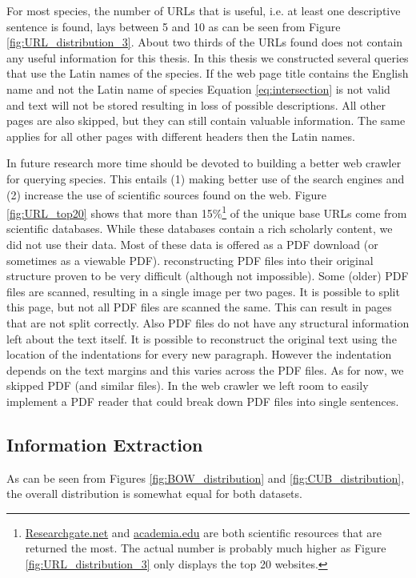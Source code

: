 \documentclass[a4paper, 12pt, oneside]{book} %
\begin{document}
For most species, the number of URLs that is useful, i.e. at least one descriptive sentence is found, lays between 5 and 10 as can be seen from Figure \ref{fig:URL_distribution_3}.
About two thirds of the URLs found does not contain any useful information for this thesis.
In this thesis we constructed several queries that use the Latin names of the species.
If the web page title contains the English name and not the Latin name of species Equation \ref{eq:intersection} is not valid and text will not be stored resulting in loss of possible descriptions.
All other pages are also skipped, but they can still contain valuable information.
The same applies for all other pages with different headers then the Latin names.

In future research more time should be devoted to building a better web crawler for querying species.
This entails (1) making better use of the search engines and (2) increase the use of scientific sources found on the web.
Figure \ref{fig:URL_top20} shows that more than 15\%\footnote{\href{https://www.researchgate.net/}{Researchgate.net} and \href{https://www.academia.edu/}{academia.edu} are both scientific resources that are returned the most. The actual number is probably much higher as Figure \ref{fig:URL_distribution_3} only displays the top 20 websites.} of the unique base URLs come from scientific databases.
While these databases contain a rich scholarly content, we did not use their data.
Most of these data is offered as a PDF download (or sometimes as a viewable PDF).
reconstructing PDF files into their original structure proven to be very difficult (although not impossible).
Some (older) PDF files are scanned, resulting in a single image per two pages. 
It is possible to split this page, but not all PDF files are scanned the same. 
This can result in pages that are not split correctly.
Also PDF files do not have any structural information left about the text itself. 
It is possible to reconstruct the original text using the location of the indentations for every new paragraph.
However the indentation depends on the text margins and this varies across the PDF files.
As for now, we skipped PDF (and similar files). 
In the web crawler we left room to easily implement a PDF reader that could break down PDF files into single sentences.

\subsection{Information Extraction}
As can be seen from Figures \ref{fig:BOW_distribution} and \ref{fig:CUB_distribution}, the overall distribution is somewhat equal for both datasets.
\end{document}

